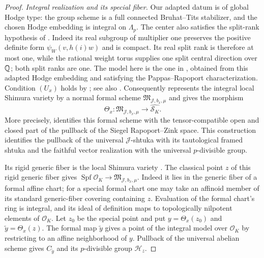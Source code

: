 \begin{proof}
\medskip\noindent
\emph{Integral realization and its special fiber.}
Our adapted datum is of global Hodge type: the group scheme is
a full connected Bruhat--Tits stabilizer, and the chosen Hodge
embedding is integral on $\Lambda_p$.
The center also satisfies the split-rank hypothesis of
\cite[\S4.1]{PappasRapoport2024}.  Indeed its real subgroup of
multiplier one preserves the positive definite form
$\psi_W(v,h(i)w)$ and is compact.  Its real split rank is
therefore at most one, while the rational weight torus supplies
one split central direction over $\mathbb Q$; both split ranks are one.
The model here is the one in
\cite[\S2.1.11 and Theorem~2.1.12]{KisinZhou2025}, obtained
from this adapted Hodge embedding and satisfying the
Pappas--Rapoport characterization.  Condition $(U_x)$ holds
by \cite[Corollary~6.3]{GleasonLimXu2026}; see also
\cite[Remark~4.10.4]{PappasRapoport2024}.  Consequently
\cite[Theorem~4.10.6]{PappasRapoport2024} represents the integral
local Shimura variety by a normal formal scheme
$\mathfrak M_{\mathcal J,b_x,\mu}$ and gives the morphism
\[
 \Theta_x:\mathfrak M_{\mathcal J,b_x,\mu}
          \longrightarrow\widehat{\mathcal S_K}.
\]
More precisely, \cite[\S4.10.2, (4.10.2)--(4.10.6)]{PappasRapoport2024}
identifies this formal scheme with the tensor-compatible open and
closed part of the pullback of the Siegel Rapoport--Zink space.
This construction identifies the pullback of the universal
$\mathcal J$-shtuka with its tautological framed shtuka and the
faithful vector realization with the universal $p$-divisible group.

Its rigid generic fiber is the local Shimura variety
\cite[Proposition~3.5.1(i)]{PappasRapoport2024}.
The classical point $z$ of this rigid generic fiber gives
$\operatorname{Spf}\mathcal O_K\to\mathfrak M_{\mathcal J,b_x,\mu}$.
Indeed it lies in the generic fiber of a formal affine chart;
for a special formal chart one may take an affinoid member of
its standard generic-fiber covering containing $z$.
Evaluation of the formal chart's ring is integral, and its
ideal of definition maps to topologically nilpotent elements of
$\mathcal O_K$.  Let $z_0$ be the special point and put
$y=\Theta_x(z_0)$ and $\widetilde y=\Theta_x(z)$.
The formal map $\widetilde y$ gives a point of the integral model
over $\mathcal O_K$ by restricting to an affine neighborhood of
$y$.  Pullback of the universal abelian scheme gives
$C_{\widetilde y}$ and its $p$-divisible group $\mathcal H_z$.


\end{proof}
